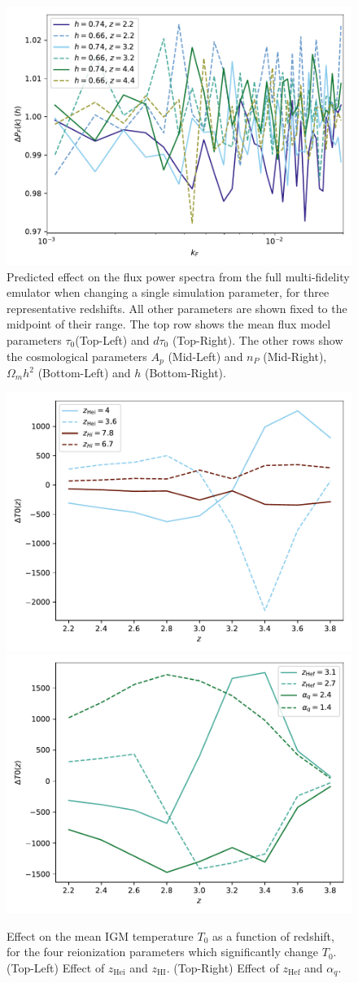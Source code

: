 \documentclass[a4paper,11pt]{article}
\begin{document}
\begin{figure}
    	\includegraphics[width=0.48\columnwidth]{figures/single_param_hub.pdf}
    \caption{Predicted effect on the flux power spectra from the full multi-fidelity emulator when changing a single simulation parameter, for three representative redshifts. All other parameters are shown fixed to the midpoint of their range. The top row shows the mean flux model parameters $\tau_0$(Top-Left) and $d\tau_0$ (Top-Right). The other rows show the cosmological parameters $A_p$ (Mid-Left) and $n_P$ (Mid-Right), $\Omega_m h^2$ (Bottom-Left) and $h$ (Bottom-Right). }
    \label{fig:Apnsfluxpower}
\end{figure}

\begin{figure}
    \centering
    \includegraphics[width=0.48\columnwidth]{figures/single_param_t0_hi_.pdf}
    \includegraphics[width=0.48\columnwidth]{figures/single_param_t0_hef_.pdf} \\
    \caption{Effect on the mean IGM temperature $T_0$ as a function of redshift, for the four reionization parameters which significantly change $T_0$. (Top-Left) Effect of $z_\mathrm{Hei}$ and $z_\mathrm{HI}$. (Top-Right) Effect of $z_\mathrm{Hef}$ and $\alpha_q$.}
    \label{fig:meantempfluxpower}
\end{figure}
\end{document}
